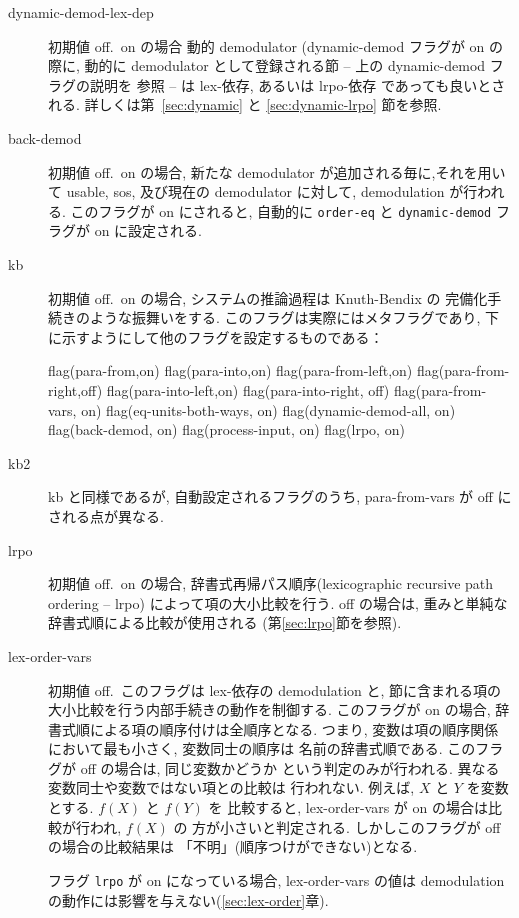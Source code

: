 \begin{description}
\item[dynamic-demod-lex-dep] 初期値 off.\ on の場合
  動的 demodulator (dynamic-demod フラグが on の際に, 動的に
  demodulator として登録される節 -- 上の dynamic-demod フラグの説明を
  参照 -- は lex-依存, あるいは lrpo-依存 であっても良いとされる. 
  詳しくは第~\ref{sec:dynamic} と \ref{sec:dynamic-lrpo} 節を参照.

\item[back-demod] 初期値 off.\ on の場合, 
  新たな demodulator が追加される毎に,それを用いて usable, sos, 及び現在の
  demodulator に対して, demodulation が行われる.
  このフラグが on にされると, 自動的に \texttt{order-eq} と 
  \texttt{dynamic-demod} フラグが on に設定される.

\item[kb] 初期値 off.\ on の場合, システムの推論過程は Knuth-Bendix の
  完備化手続きのような振舞いをする. このフラグは実際にはメタフラグであり,
  下に示すようにして他のフラグを設定するものである：
\begin{simplev}
  flag(para-from,on)
  flag(para-into,on)
  flag(para-from-left,on)
  flag(para-from-right,off)
  flag(para-into-left,on)
  flag(para-into-right, off)
  flag(para-from-vars, on)
  flag(eq-units-both-ways, on)
  flag(dynamic-demod-all, on)
  flag(back-demod, on)
  flag(process-input, on)
  flag(lrpo, on)
\end{simplev}  

\item[kb2] kb と同様であるが, 自動設定されるフラグのうち, 
  para-from-vars が off にされる点が異なる.

\item[lrpo] 初期値 off.\ on の場合, 辞書式再帰パス順序(lexicographic
  recursive path ordering -- lrpo) によって項の大小比較を行う.
  off の場合は, 重みと単純な辞書式順による比較が使用される
  (第\ref{sec:lrpo}節を参照).

\item[lex-order-vars] 初期値 off.\ このフラグは lex-依存の demodulation
  と, 節に含まれる項の大小比較を行う内部手続きの動作を制御する.
  このフラグが on の場合, 辞書式順による項の順序付けは全順序となる.
  つまり, 変数は項の順序関係において最も小さく, 変数同士の順序は
  名前の辞書式順である. このフラグが off の場合は, 同じ変数かどうか
  という判定のみが行われる. 異なる変数同士や変数ではない項との比較は
  行われない. 例えば, $X$ と $Y$ を変数とする. $f(X)$ と $f(Y)$ を
  比較すると, lex-order-vars が on の場合は比較が行われ, $f(X)$ の
  方が小さいと判定される. しかしこのフラグが off の場合の比較結果は
  「不明」(順序つけができない)となる.

  フラグ \texttt{lrpo} が on になっている場合, lex-order-vars の値は
  demodulation の動作には影響を与えない(\ref{sec:lex-order}章).
  
\end{description}

